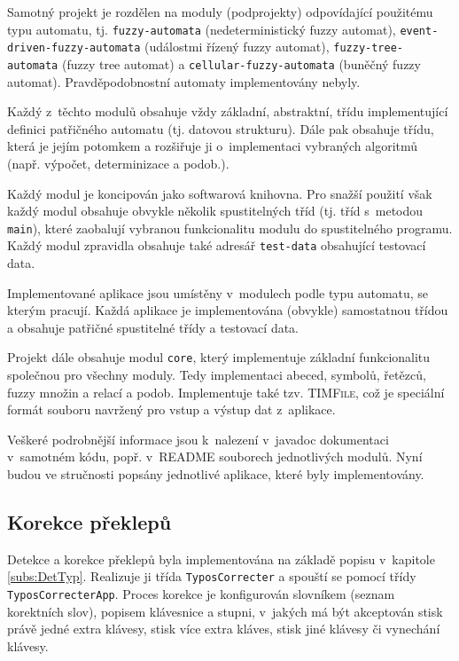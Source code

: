 Samotný projekt je rozdělen na moduly (podprojekty) odpovídající použitému typu automatu, tj. \verb|fuzzy-automata| (nedeterministický fuzzy automat), \verb|event-driven-fuzzy-automata| (událostmi řízený fuzzy automat), \verb|fuzzy-tree-automata| (fuzzy tree automat) a \verb|cellular-fuzzy-automata| (buněčný fuzzy automat). Pravděpodobnostní automaty implementovány nebyly.

Každý z~těchto modulů obsahuje vždy základní, abstraktní, třídu implementující definici patřičného automatu (tj. datovou strukturu). Dále pak obsahuje třídu, která je jejím potomkem a rozšiřuje ji o~implementaci vybraných algoritmů (např. výpočet, determinizace a podob.).

Každý modul je koncipován jako softwarová knihovna. Pro snažší použití však každý modul obsahuje obvykle několik spustitelných tříd (tj. tříd s~metodou \verb|main|), které zaobalují vybranou funkcionalitu modulu do spustitelného programu. Každý modul zpravidla obsahuje také adresář \verb|test-data| obsahující testovací data.

Implementované aplikace jsou umístěny v~modulech podle typu automatu, se kterým pracují. Každá aplikace je implementována (obvykle) samostatnou třídou a obsahuje patřičné spustitelné třídy a testovací data.

Projekt dále obsahuje modul \verb|core|, který implementuje základní funkcionalitu společnou pro všechny moduly. Tedy implementaci abeced, symbolů, řetězců, fuzzy množin a relací a podob. Implementuje také tzv. \textsc{TIMFile}, což je speciální formát souboru navržený pro vstup a výstup dat z~aplikace.

Veškeré podrobnější informace jsou k~nalezení v~javadoc dokumentaci v~samotném kódu, popř. v~\textsc{README} souborech jednotlivých modulů. Nyní budou ve stručnosti popsány jednotlivé aplikace, které byly implementovány.

\subsection{Korekce překlepů}
Detekce a korekce překlepů byla implementována na základě popisu v~kapitole \ref{subs:DetTyp}. Realizuje ji třída \verb|TyposCorrecter| a spouští se pomocí třídy \verb|TyposCorrecterApp|. Proces korekce je konfigurován slovníkem (seznam korektních slov), popisem klávesnice a stupni, v~jakých má být akceptován stisk právě jedné extra klávesy, stisk více extra kláves, stisk jiné klávesy či vynechání klávesy.

